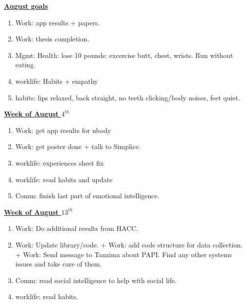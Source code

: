 \documentclass[serif, mathserif, final]{beamer}
\begin{document}
\begin{frame}{}
\begin{columns}
\begin{column}{0.27\linewidth}
\begin{block}{\underline{\textbf{August goals}}}
\begin{enumerate}
\item \small Work: app results + papers.
\item \small Work: thesis completion.
\item \small Mgmt: Health: lose 10 pounds:  excercise butt, chest, wrists. Run without eating.
\item \small worklife: Habits + empathy
\item \small habits: lips relaxed, back straight, no teeth clicking/body noises, feet quiet.
\end{enumerate}
\end{block} 

\begin{block}{\small \underline{\textbf{Week of August $4^{th}$}}} 
\begin{enumerate}
\tiny \item \tiny Work: get app results for nbody
\item \tiny Work: get poster done + talk to Simplice.
\item \tiny worklife: experiences sheet fix
\item \tiny worklife: read habits and update
\item \tiny Comm: finish last part of emotional intelligence.
\end{enumerate}
\end{block}

\begin{block}{\small \underline{\textbf{Week of August $13^{th}$}}}
\begin{enumerate}
\tiny \item \tiny Work: Do additional results from HACC.
\item \tiny Work: Update library/code.  +  Work: add code structure for data collection. +  Work: Send message to Tanzima about PAPI. Find any other systems issues and take care of them.
\item \tiny Comm: read social intelligence to help with social life.
\item \tiny worklife: read habits.
\end{enumerate}
\end{block} 


\end{column}
\end{columns}
\end{frame}
\end{document}

